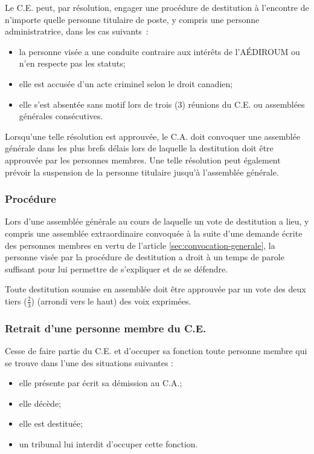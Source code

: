 \documentclass{aediroum}
\newcommand{\article}[1]{article \ref{#1}}
\begin{document}
Le C.E. peut, par résolution, engager une procédure de destitution à l'encontre de n'importe quelle personne titulaire de poste, y compris une personne administratrice, dans les cas suivants~:
\begin{itemize}
    \item la personne visée a une conduite contraire aux intérêts de l'AÉDIROUM ou n'en respecte pas les statuts;
    \item elle est accusée d'un acte criminel selon le droit canadien;
    \item elle s'est absentée sans motif lors de trois (3) réunions du C.E. ou assemblées générales consécutives.
\end{itemize}

Lorsqu'une telle résolution est approuvée, le C.A. doit convoquer une assemblée générale dans les plus brefs délais lors de laquelle la destitution doit être approuvée par les personnes membres. Une telle résolution peut également prévoir la suspension de la personne titulaire jusqu'à l'assemblée générale.

\subsubsection{Procédure}\label{sec:destitution-procedure}

Lors d'une assemblée générale au cours de laquelle un vote de destitution a lieu, y compris une assemblée extraordinaire convoquée à la suite d'une demande écrite des personnes membres en vertu de l'\article{sec:convocation-generale}, la personne visée par la procédure de destitution a droit à un temps de parole suffisant pour lui permettre de s'expliquer et de se défendre.

Toute destitution soumise en assemblée doit être approuvée par un vote des deux tiers (\( \frac{2}{3} \)) (arrondi vers le haut) des voix exprimées.

\subsubsection{Retrait d'une personne membre du C.E.}\label{sec:retrait-dun-membre-exec-admin}

Cesse de faire partie du C.E. et d'occuper sa fonction toute personne membre qui se trouve dans l'une des situations suivantes :
\begin{itemize}
    \item elle présente par écrit sa démission au C.A.;
    \item elle décède;
    \item elle est destituée;
    \item un tribunal lui interdit d'occuper cette fonction.
\end{itemize}
\end{document}

